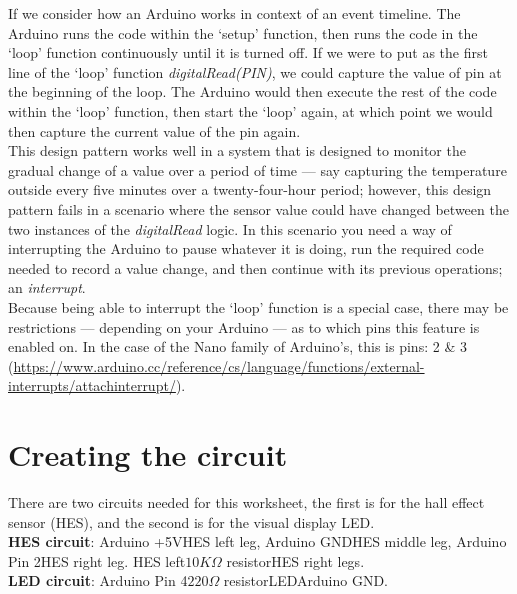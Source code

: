 \documentclass[11pt,a4paper]{article}
\begin{document}
\noindent
If we consider how an Arduino works in context of an event timeline. The Arduino runs the code within the `setup' function, then runs the code in the `loop' function continuously until it is turned off. If we were to put as the first line of the `loop' function \textit{digitalRead(PIN)}, we could capture the value of pin at the beginning of the loop. The Arduino would then execute the rest of the code within the `loop' function, then start the `loop' again, at which point we would then capture the current value of the pin again.\\

\noindent
This design pattern works well in a system that is designed to monitor the gradual change of a value over a period of time --- say capturing the temperature outside every five minutes over a twenty-four-hour period; however, this design pattern fails in a scenario where the sensor value could have changed between the two instances of the \textit{digitalRead} logic. In this scenario you need a way of interrupting the Arduino to pause whatever it is doing, run the required code needed to record a value change, and then continue with its previous operations; an \textit{interrupt}.\\

\noindent
Because being able to interrupt the `loop' function is a special case, there may be restrictions --- depending on your Arduino --- as to which pins this feature is enabled on. In the case of the Nano family of Arduino's, this is pins: 2 \& 3 (\url{https://www.arduino.cc/reference/cs/language/functions/external-interrupts/attachinterrupt/}).\\

\section{Creating the circuit}
\label{sec:circuit}
There are two circuits needed for this worksheet, the first is for the hall effect sensor (HES), and the second is for the visual display LED.\\
\noindent
\textbf{HES circuit}: Arduino +5V\textrightarrow\hspace{0.1em}HES left leg, Arduino GND\textrightarrow\hspace{0.1em}HES middle leg, Arduino Pin 2\textrightarrow\hspace{0.1em}HES right leg. HES left\textrightarrow \hspace{0.1em}$10K\Omega$ resistor\textrightarrow\hspace{0.1em}HES right legs.\\
\noindent
\textbf{LED circuit}: Arduino Pin 4\textrightarrow $220\Omega$ resistor\textrightarrow LED\textrightarrow Arduino GND.\\
\end{document}
